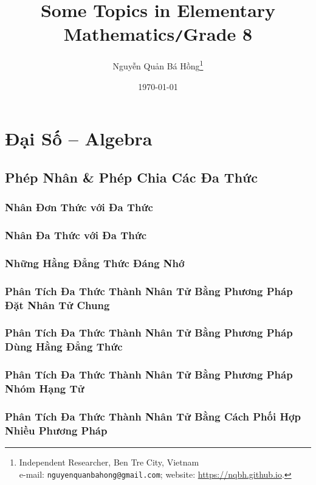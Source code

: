 \documentclass[oneside]{book}
\title{Some Topics in Elementary Mathematics\texttt{/}Grade 8}
\author{Nguyễn Quản Bá Hồng\footnote{Independent Researcher, Ben Tre City, Vietnam\\e-mail: \texttt{nguyenquanbahong@gmail.com}; website: \url{https://nqbh.github.io}.}}
\date{\today}
\numberwithin{equation}{section}
\begin{document}
\frontmatter
\maketitle
\setcounter{secnumdepth}{4}
\setcounter{tocdepth}{3}
\tableofcontents
\newpage


\part{Đại Số -- Algebra}

\chapter{Phép Nhân \& Phép Chia Các Đa Thức}

\section{Nhân Đơn Thức với Đa Thức}

\section{Nhân Đa Thức với Đa Thức}

\section{Những Hằng Đẳng Thức Đáng Nhớ}

\section{Phân Tích Đa Thức Thành Nhân Tử Bằng Phương Pháp Đặt Nhân Tử Chung}

\section{Phân Tích Đa Thức Thành Nhân Tử Bằng Phương Pháp Dùng Hằng Đẳng Thức}

\section{Phân Tích Đa Thức Thành Nhân Tử Bằng Phương Pháp Nhóm Hạng Tử}

\section{Phân Tích Đa Thức Thành Nhân Tử Bằng Cách Phối Hợp Nhiều Phương Pháp}
\end{document}
